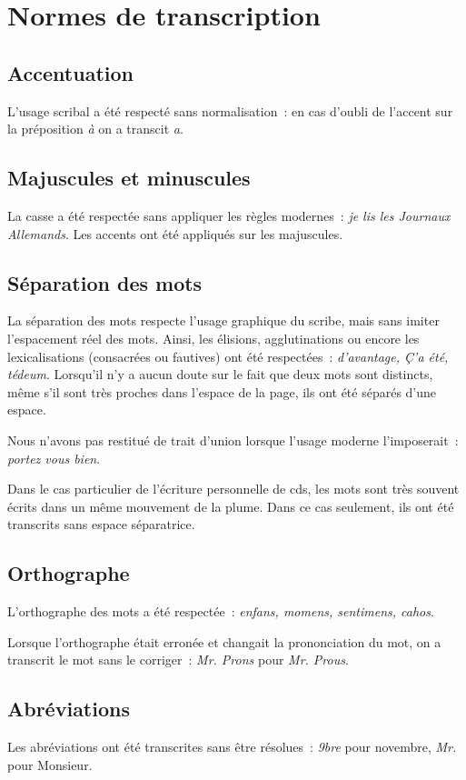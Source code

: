 \documentclass[a4paper,12pt,twoside]{book}
\begin{document}
	\chapter{Normes de transcription}
		\label{normes-trans}
	
		\section{Accentuation}
			L'usage scribal a été respecté sans normalisation~: en cas d'oubli de l'accent sur la préposition \textit{à} on a transcit \textit{a}.
		
		\section{Majuscules et minuscules}
			La casse a été respectée sans appliquer les règles modernes~: \textit{je lis les Journaux Allemands}. Les accents ont été appliqués sur les majuscules.
		
		\section{Séparation des mots}
			La séparation des mots respecte l'usage graphique du scribe, mais sans imiter l'espacement réel des mots. Ainsi, les élisions, agglutinations ou encore les lexicalisations (consacrées ou fautives) ont été respectées~: \textit{d'avantage, Ç'a été, tédeum}. Lorsqu'il n'y a aucun doute sur le fait que deux mots sont distincts, même s'il sont très proches dans l'espace de la page, ils ont été séparés d'une espace.
		
			Nous n'avons pas restitué de trait d'union lorsque l'usage moderne l'imposerait~: \textit{portez vous bien}.
	
			Dans le cas particulier de l'écriture personnelle de \gls{cds}, les mots sont très souvent écrits dans un même mouvement de la plume. Dans ce cas seulement, ils ont été transcrits sans espace séparatrice.
				
		\section{Orthographe}
			L'orthographe des mots a été respectée~: \textit{enfans, momens, sentimens, cahos}.
			
			Lorsque l'orthographe était erronée et changait la prononciation du mot, on a transcrit le mot sans le corriger~: \textit{Mr. Prons} pour \textit{Mr. Prous}.
		
		\section{Abréviations}
			Les abréviations ont été transcrites sans être résolues~: \textit{9bre} pour novembre, \textit{Mr.} pour Monsieur.
		
\end{document}
